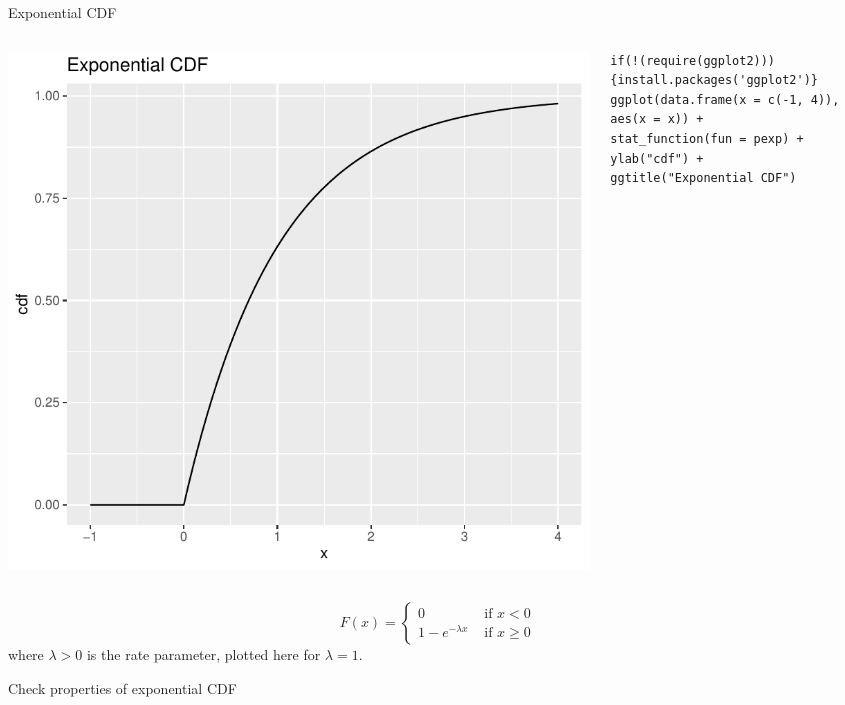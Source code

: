 \begin{frame}[fragile]{Exponential CDF}
\begin{columns}
\begin{column}{0.5\textwidth}
\begin{center}
\includegraphics[height=.5\textheight]{exp-cdf} 
\end{center}
\end{column}
\begin{column}{0.5\textwidth} 
\begin{lstlisting}
if(!(require(ggplot2))){install.packages('ggplot2')}
ggplot(data.frame(x = c(-1, 4)), aes(x = x)) +
stat_function(fun = pexp) +
ylab("cdf") +
ggtitle("Exponential CDF")
\end{lstlisting}
\end{column}
\end{columns}
\[
F\left(x\right) = \begin{cases}
	0 & \text{ if }x<0\\
	1 - e^{- \lambda x}  & \text{ if }x\ge 0
\end{cases}
\]
where $\lambda > 0$ is the rate parameter, plotted here for $\lambda=1$.

\end{frame}


\begin{frame}{Check properties of exponential CDF}

\end{frame}



